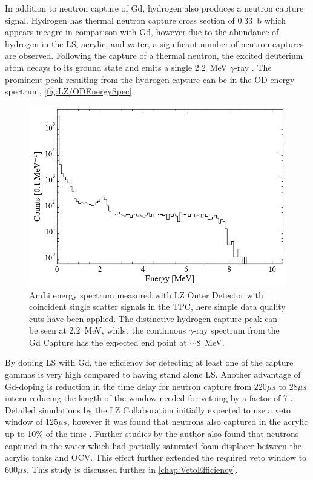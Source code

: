 In addition to neutron capture of Gd, hydrogen also produces a neutron capture signal. Hydrogen has thermal neutron capture cross section of 0.33~b which appears meagre in comparison with Gd, however due to the abundance of hydrogen in the LS, acrylic, and water, a significant number of neutron captures are observed. Following the capture of a thermal neutron, the excited deuterium atom decays to its ground state and emits a single 2.2~MeV $\gamma$-ray \cite{LZTDR}. The prominent peak resulting from the hydrogen capture can be in the OD energy spectrum, \autoref{fig:LZ/ODEnergySpec}.

\begin{figure}[!ht]
    \centering
    \includegraphics[width=0.8\linewidth]{figures/LZ/ODEnergySpec.png}
    \caption{AmLi energy spectrum measured with LZ Outer Detector with coincident single scatter signals in the TPC, here simple data quality cuts have been applied. The distinctive hydrogen capture peak can be seen at 2.2~MeV, whilst the continuous $\gamma$-ray spectrum from the Gd Capture has the expected end point at $\mathtt{\sim}$8~MeV.}
    \label{fig:LZ/ODEnergySpec}
\end{figure}

By doping LS with Gd, the efficiency for detecting at least one of the capture gammas is very high compared to having stand alone LS. Another advantage of Gd-doping is reduction in the time delay for neutron capture from $220\mu s$ to $28\mu s$ intern reducing the length of the window needed for vetoing by a factor of 7 \cite{LZTDR}. Detailed simulations by the LZ Collaboration initially expected to use a veto window of $125\mu s$, however it was found that neutrons also captured in the acrylic up to 10\% of the time \cite{LZTDR}. Further studies by the author also found that neutrons captured in the water which had partially saturated foam displacer between the acrylic tanks and OCV. This effect further extended the required veto window to $600\mu s$. This study is discussed further in \autoref{chap:VetoEfficiency}.

